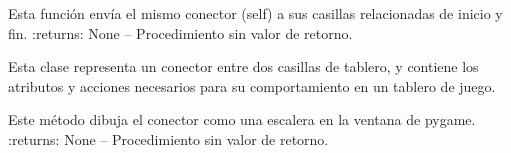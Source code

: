\documentclass[letterpaper,10pt,english]{sphinxmanual}
\begin{document}
\begin{fulllineitems}
\begin{fulllineitems}
\begin{quote}
\begin{description}
\end{description}\end{quote}

\end{fulllineitems}


\begin{fulllineitems}
\label{\detokenize{codigo:conector.ConectorSE.sendConector}}
Esta función envía el mismo conector (self) a sus casillas relacionadas de inicio y fin.
:returns:  None -- Procedimiento sin valor de retorno.

\end{fulllineitems}


\end{fulllineitems}


\begin{fulllineitems}
\label{\detokenize{codigo:conector.Escalera}}
Esta clase representa un conector entre dos casillas de tablero, y contiene los
atributos y acciones necesarios para su comportamiento en un tablero de juego.

\begin{fulllineitems}
\label{\detokenize{codigo:conector.Escalera.dibujar}}
Este método dibuja el conector como una escalera en la ventana de pygame.
:returns:  None -- Procedimiento sin valor de retorno.

\end{fulllineitems}


\end{fulllineitems}

\end{document}
